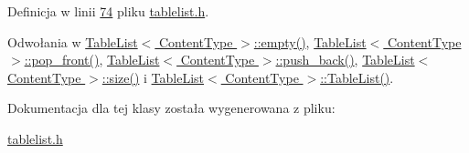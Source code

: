 Definicja w linii \hyperlink{tablelist_8h_source_l00074}{74} pliku \hyperlink{tablelist_8h_source}{tablelist.\-h}.



Odwołania w \hyperlink{tablelist_8h_source_l00127}{Table\-List$<$ Content\-Type $>$\-::empty()}, \hyperlink{tablelist_8h_source_l00160}{Table\-List$<$ Content\-Type $>$\-::pop\-\_\-front()}, \hyperlink{tablelist_8h_source_l00188}{Table\-List$<$ Content\-Type $>$\-::push\-\_\-back()}, \hyperlink{tablelist_8h_source_l00106}{Table\-List$<$ Content\-Type $>$\-::size()} i \hyperlink{tablelist_8h_source_l00093}{Table\-List$<$ Content\-Type $>$\-::\-Table\-List()}.



Dokumentacja dla tej klasy została wygenerowana z pliku\-:\begin{DoxyCompactItemize}
\item 
\hyperlink{tablelist_8h}{tablelist.\-h}\end{DoxyCompactItemize}
